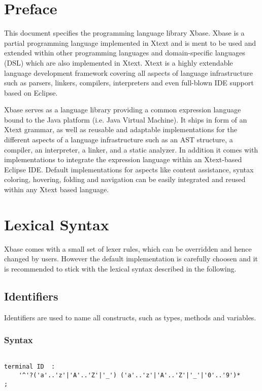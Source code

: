 \documentclass[a4paper,10pt]{scrreprt}
\begin{document}
\chapter{Preface}
\label{Preface}

This document specifies the programming language library Xbase. Xbase is a partial programming language implemented in Xtext and is ment to be used and extended
 within other programming languages and domain-specific languages (DSL) which are also implemented in Xtext. Xtext is a highly extendable language development framework 
covering all aspects of language infrastructure such as parsers, linkers, compilers, interpreters and even full-blown IDE support based on Eclipse. 

Xbase serves as a language library providing a common expression language bound to the Java platform (i.e. Java Virtual Machine). It ships in form of an Xtext grammar, as well as 
reusable and adaptable implementations for the different aspects of a language infrastructure such as an AST structure, a compiler, an interpreter, a linker,  and  a static analyzer.
In addition it comes with implementations to integrate the expression language within an Xtext-based Eclipse IDE. Default implementations for aspects like content assistance, syntax coloring, 
hovering, folding and navigation can be easily integrated and reused within any Xtext based language. 



\chapter{Lexical Syntax}

Xbase comes with a small set of lexer rules, which can be overridden and hence changed by users. However the default implementation is carefully choosen and it is recommended to stick 
with the lexical syntax described in the following.

\section{Identifiers}
\label{Identifiers}

Identifiers are used to name all constructs, such as types, methods and variables.

\subsection{ Syntax }


\begin{lstlisting}

terminal ID  : 
	'^'?('a'..'z'|'A'..'Z'|'_') ('a'..'z'|'A'..'Z'|'_'|'0'..'9')*
;

\end{lstlisting}
\end{document}
